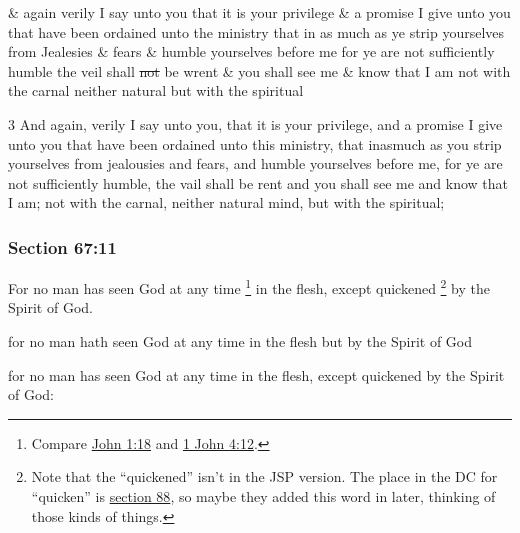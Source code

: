 		\begin{framed}
		\scriptsize
			\begin{compactdesc}
				\item[JSP] \& again verily I say unto you that it is your privilege \& a promise I give unto you that have been ordained unto the ministry that in as much as ye strip yourselves from Jealesies \& fears \& humble yourselves before me for ye are not sufficiently humble the veil shall \sout{not} be wrent \& you shall see me \& know that I am not with the carnal neither natural but with the spiritual
				\item[DC 1835] 3 And again, verily I say unto you, that it is your privilege, and a promise I give unto you that have been ordained unto this ministry, that inasmuch as you strip yourselves from jealousies and fears, and humble yourselves before me, for ye are not sufficiently humble, the vail shall be rent and you shall see me and know that I am; not with the carnal, neither natural mind, but with the spiritual; 
			\end{compactdesc}
		\end{framed}

	\subsubsection{Section 67:11} %
		\label{DC67-11}

		For no man has seen God at any time%
			\footnote{%
				Compare \hyperref[JOHN-1-18]{John 1:18} and \hyperref[1JOHN-4-12]{1 John 4:12}.
				}
		in the flesh, except quickened%
			\footnote{%
				Note that the ``quickened'' isn't in the JSP version. The place in the DC for ``quicken'' is \hyperref[DC88]{section 88}, so maybe they added this word in later, thinking of those kinds of things.
				} 
		by the Spirit of God.

		\begin{framed}
		\scriptsize
			\begin{compactdesc}
				\item[JSP] for no man hath seen God at any time in the flesh but by the Spirit of God
				\item[DC 1835] for no man has seen God at any time in the flesh, except quickened by the Spirit of God:
			\end{compactdesc}
		\end{framed}

